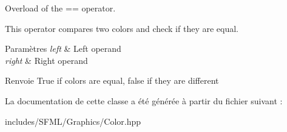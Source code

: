 Overload of the == operator. 

This operator compares two colors and check if they are equal.


\begin{DoxyParams}{Paramètres}
{\em left} & Left operand \\
\hline
{\em right} & Right operand\\
\hline
\end{DoxyParams}
\begin{DoxyReturn}{Renvoie}
True if colors are equal, false if they are different 
\end{DoxyReturn}


La documentation de cette classe a été générée à partir du fichier suivant \+:\begin{DoxyCompactItemize}
\item 
includes/\+S\+F\+M\+L/\+Graphics/Color.\+hpp\end{DoxyCompactItemize}
